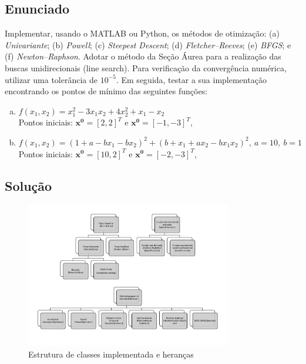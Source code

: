 \documentclass[10pt, a4paper]{article}
\begin{document}
\subsection{Enunciado}

Implementar, usando o MATLAB ou Python, os métodos de otimização: (a) \textit{Univariante}; (b) \textit{Powell}; (c) \textit{Steepest Descent}; 
(d) \textit{Fletcher–Reeves}; (e) \textit{BFGS}; e (f) \textit{Newton–Raphson}. Adotar o método da Seção Áurea para a realização das buscas unidirecionais
(line search). Para verificação da convergência numérica, utilizar uma tolerância de $10^{-5}$. Em seguida, testar a sua implementação encontrando os pontos
de mínimo das seguintes funções:

\begin{enumerate}[(a)]
  \item $f(x_1, x_2) = x_1^2 - 3x_1x_2 + 4x_2^2 + x_1 - x_2$ \\
        Pontos iniciais: $\mathbf{x^0} = [2, 2]^T$ e $\mathbf{x^0} = [-1, -3]^T$, \label{func:a}
  \item $f(x_1, x_2) = (1 + a - bx_1 - bx_2)^2 + (b + x_1 + ax_2 - bx_1x_2)^2, \ a = 10, \ b = 1$ \\
        Pontos iniciais: $\mathbf{x^0} = [10, 2]^T$ e $\mathbf{x^0} = [-2, -3]^T$, \label{func:b}
\end{enumerate}

\subsection{Solução}

\begin{figure}[htpb]
  \centering
  \includegraphics[width=0.8\textwidth]{../general/classes_full.pdf}
  \caption{Estrutura de classes implementada e heranças}
  \label{fig:q1_1}
\end{figure}
\end{document}

